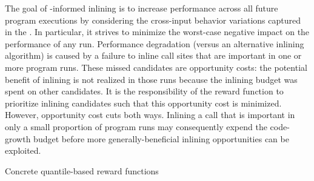 The goal of \CP-informed inlining is to increase performance across
all future program executions by considering the cross-input behavior
variations captured in the \CProf.  In particular, it strives to
minimize the worst-case negative impact on the performance of any
run. Performance degradation (versus an alternative inlining
algorithm) is caused by a failure to inline call sites that are
important in one or more program runs.  These missed candidates are
opportunity costs: the potential benefit of inlining is not realized
in those runs because the inlining budget was spent on other
candidates.  It is the responsibility of the reward function to
prioritize inlining candidates such that this opportunity cost is
minimized.  However, opportunity cost cuts both ways.  Inlining a call
that is important in only a small proportion of program runs may
consequently expend the code-growth budget before more
generally-beneficial inlining opportunities can be exploited.

%
%
%

\begin{table}
  \centering
  \begin{tiny}
  
  \end{tiny}
  \caption{Concrete quantile-based reward functions}
  \label{tab:qpoints}
\end{table}

